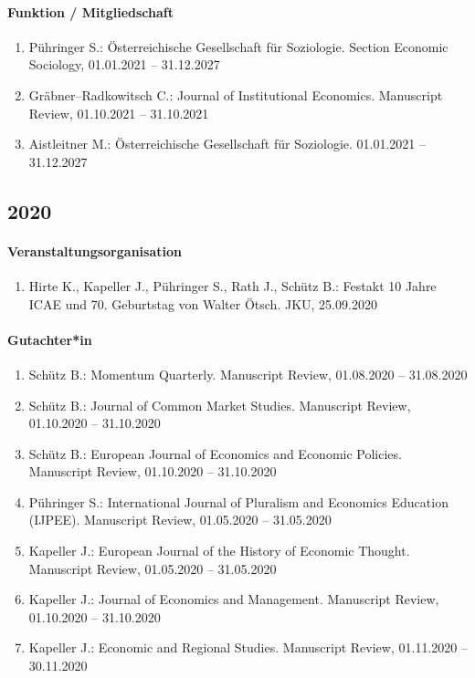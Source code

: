 \paragraph{Funktion / Mitgliedschaft}
\begin{enumerate}[leftmargin=*, labelsep=0.5cm]
\item Pühringer S.: Österreichische Gesellschaft für Soziologie. Section Economic Sociology, 01.01.2021 -- 31.12.2027
\item Gräbner--Radkowitsch C.: Journal of Institutional Economics. Manuscript Review, 01.10.2021 -- 31.10.2021
\item Aistleitner M.: Österreichische Gesellschaft für Soziologie. 01.01.2021 -- 31.12.2027
\end{enumerate}
\subsection*{2020}
\paragraph{Veranstaltungsorganisation}
\begin{enumerate}[leftmargin=*, labelsep=0.5cm]
\item Hirte K., Kapeller J., Pühringer S., Rath J., Schütz B.: Festakt 10 Jahre ICAE und 70. Geburtstag von Walter Ötsch. JKU, 25.09.2020
\end{enumerate}

\paragraph{Gutachter*in}
\begin{enumerate}[leftmargin=*, labelsep=0.5cm]
\item Schütz B.: Momentum Quarterly. Manuscript Review, 01.08.2020 -- 31.08.2020
\item Schütz B.: Journal of Common Market Studies. Manuscript Review, 01.10.2020 -- 31.10.2020
\item Schütz B.: European Journal of Economics and Economic Policies. Manuscript Review, 01.10.2020 -- 31.10.2020
\item Pühringer S.: International Journal of Pluralism and Economics Education (IJPEE). Manuscript Review, 01.05.2020 -- 31.05.2020
\item Kapeller J.: European Journal of the History of Economic Thought. Manuscript Review, 01.05.2020 -- 31.05.2020
\item Kapeller J.: Journal of Economics and Management. Manuscript Review, 01.10.2020 -- 31.10.2020
\item Kapeller J.: Economic and Regional Studies. Manuscript Review, 01.11.2020 -- 30.11.2020
\end{enumerate}

